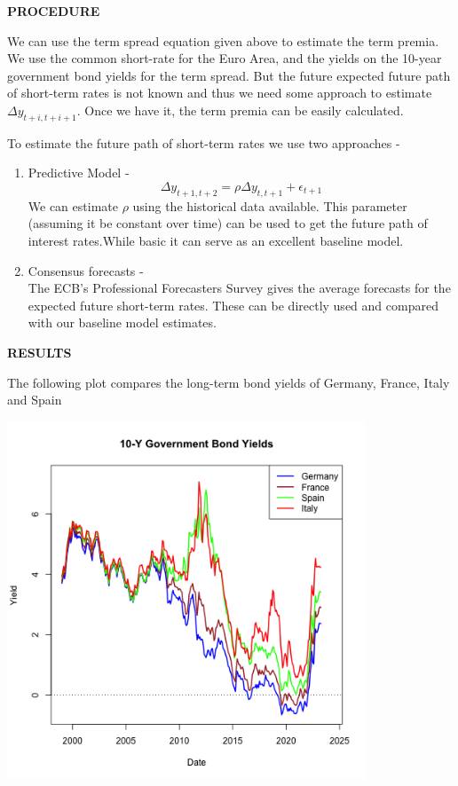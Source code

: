 \documentclass[
]{article}
\begin{document}
\bigskip

\textbf{PROCEDURE}

We can use the term spread equation given above to estimate the term
premia. We use the common short-rate for the Euro Area, and the yields
on the 10-year government bond yields for the term spread. But the
future expected future path of short-term rates is not known and thus we
need some approach to estimate \(\Delta y_{t+i,t+i+1}\). Once we have
it, the term premia can be easily calculated.

To estimate the future path of short-term rates we use two approaches -

\begin{enumerate}
\def\labelenumi{\arabic{enumi}.}
\item
  Predictive Model -
  \[ \Delta y_{t+1,t+2} = \rho\Delta y_{t,t+1} + \epsilon_{t+1} \] We
  can estimate \(\rho\) using the historical data available. This
  parameter (assuming it be constant over time) can be used to get the
  future path of interest rates.While basic it can serve as an excellent
  baseline model.
\item
  Consensus forecasts -\\
  The ECB's Professional Forecasters Survey gives the average forecasts
  for the expected future short-term rates. These can be directly used
  and compared with our baseline model estimates.
\end{enumerate}

\bigskip

\textbf{RESULTS}

The following plot compares the long-term bond yields of Germany,
France, Italy and Spain

\includegraphics[width=0.8\textwidth,height=\textheight]{Plots/Historical/Long Term Government Bond Yields.png}
\bigskip
\end{document}

